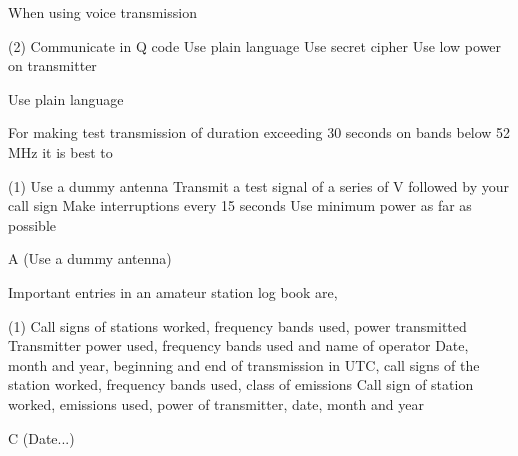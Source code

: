 \documentclass[a4paper]{article}
\begin{document}
\begin{question}When using voice transmission
	\begin{tasks}(2)
		\task Communicate in Q code
		\task Use plain language
		\task Use secret cipher
		\task Use low power on transmitter
	\end{tasks}
\end{question}

\begin{solution}
	Use plain language
\end{solution}

\vspace{5mm}



\begin{question}For making test transmission of duration exceeding 30 seconds on bands below 52 MHz it is best to
	\begin{tasks}(1)
		\task Use a dummy antenna
		\task Transmit a test signal of a series of \apostrophe{}V\apostrophe{} followed by your call sign
		\task Make interruptions every 15 seconds
		\task Use minimum power as far as possible
	\end{tasks}
\end{question}

\begin{solution}
	A (Use a dummy antenna)
\end{solution}

\vspace{5mm}



\begin{question}Important entries in an amateur station log book are,
	\begin{tasks}(1)
		\task Call signs of stations worked, frequency bands used, power transmitted
		\task Transmitter power used, frequency bands used and name of operator
		\task Date, month and year, beginning and end of transmission in UTC, call signs of the station worked, frequency bands used, class of emissions
		\task Call sign of station worked, emissions used, power of transmitter, date, month and year
	\end{tasks}
\end{question}

\begin{solution}
	C (Date...)
\end{solution}

\vspace{5mm}
\end{document}
